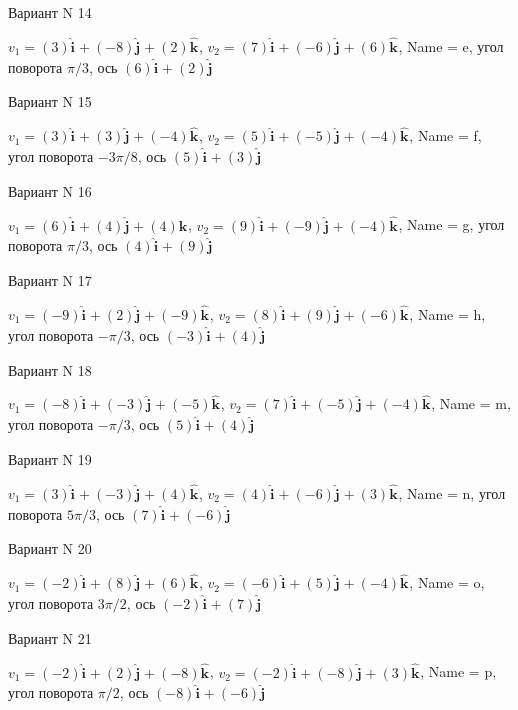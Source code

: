 \documentclass[11pt]{report}
\begin{document}
Вариант N 14

$v_1 = (3)\mathbf{\hat{i}_{}} + (-8)\mathbf{\hat{j}_{}} + (2)\mathbf{\hat{k}_{}}$, $v_2 = (7)\mathbf{\hat{i}_{}} + (-6)\mathbf{\hat{j}_{}} + (6)\mathbf{\hat{k}_{}}$, Name = e, угол поворота $\pi / 3$, ось $(6)\mathbf{\hat{i}_{}} + (2)\mathbf{\hat{j}_{}}$

Вариант N 15

$v_1 = (3)\mathbf{\hat{i}_{}} + (3)\mathbf{\hat{j}_{}} + (-4)\mathbf{\hat{k}_{}}$, $v_2 = (5)\mathbf{\hat{i}_{}} + (-5)\mathbf{\hat{j}_{}} + (-4)\mathbf{\hat{k}_{}}$, Name = f, угол поворота $- 3 \pi / 8$, ось $(5)\mathbf{\hat{i}_{}} + (3)\mathbf{\hat{j}_{}}$

Вариант N 16

$v_1 = (6)\mathbf{\hat{i}_{}} + (4)\mathbf{\hat{j}_{}} + (4)\mathbf{\hat{k}_{}}$, $v_2 = (9)\mathbf{\hat{i}_{}} + (-9)\mathbf{\hat{j}_{}} + (-4)\mathbf{\hat{k}_{}}$, Name = g, угол поворота $\pi / 3$, ось $(4)\mathbf{\hat{i}_{}} + (9)\mathbf{\hat{j}_{}}$

Вариант N 17

$v_1 = (-9)\mathbf{\hat{i}_{}} + (2)\mathbf{\hat{j}_{}} + (-9)\mathbf{\hat{k}_{}}$, $v_2 = (8)\mathbf{\hat{i}_{}} + (9)\mathbf{\hat{j}_{}} + (-6)\mathbf{\hat{k}_{}}$, Name = h, угол поворота $- \pi / 3$, ось $(-3)\mathbf{\hat{i}_{}} + (4)\mathbf{\hat{j}_{}}$

Вариант N 18

$v_1 = (-8)\mathbf{\hat{i}_{}} + (-3)\mathbf{\hat{j}_{}} + (-5)\mathbf{\hat{k}_{}}$, $v_2 = (7)\mathbf{\hat{i}_{}} + (-5)\mathbf{\hat{j}_{}} + (-4)\mathbf{\hat{k}_{}}$, Name = m, угол поворота $- \pi / 3$, ось $(5)\mathbf{\hat{i}_{}} + (4)\mathbf{\hat{j}_{}}$

Вариант N 19

$v_1 = (3)\mathbf{\hat{i}_{}} + (-3)\mathbf{\hat{j}_{}} + (4)\mathbf{\hat{k}_{}}$, $v_2 = (4)\mathbf{\hat{i}_{}} + (-6)\mathbf{\hat{j}_{}} + (3)\mathbf{\hat{k}_{}}$, Name = n, угол поворота $5 \pi / 3$, ось $(7)\mathbf{\hat{i}_{}} + (-6)\mathbf{\hat{j}_{}}$

Вариант N 20

$v_1 = (-2)\mathbf{\hat{i}_{}} + (8)\mathbf{\hat{j}_{}} + (6)\mathbf{\hat{k}_{}}$, $v_2 = (-6)\mathbf{\hat{i}_{}} + (5)\mathbf{\hat{j}_{}} + (-4)\mathbf{\hat{k}_{}}$, Name = o, угол поворота $3 \pi / 2$, ось $(-2)\mathbf{\hat{i}_{}} + (7)\mathbf{\hat{j}_{}}$

Вариант N 21

$v_1 = (-2)\mathbf{\hat{i}_{}} + (2)\mathbf{\hat{j}_{}} + (-8)\mathbf{\hat{k}_{}}$, $v_2 = (-2)\mathbf{\hat{i}_{}} + (-8)\mathbf{\hat{j}_{}} + (3)\mathbf{\hat{k}_{}}$, Name = p, угол поворота $\pi / 2$, ось $(-8)\mathbf{\hat{i}_{}} + (-6)\mathbf{\hat{j}_{}}$
\end{document}
